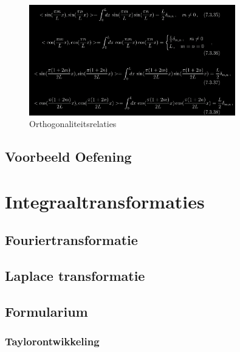 \documentclass[a4paper]{report}
\begin{document}
\begin{figure}[H]
	\centering
	\includegraphics[width=0.8\textwidth]{assets/orthogonaliteitsrelaties.png}
	\caption{Orthogonaliteitsrelaties}
	\label{fig:orthogonaliteitsrelaties}
\end{figure}

\section{Voorbeeld Oefening}





\chapter{Integraaltransformaties}

\section{Fouriertransformatie}



\section{Laplace transformatie}



\section*{Formularium}

\subsection*{Taylorontwikkeling}
\end{document}
